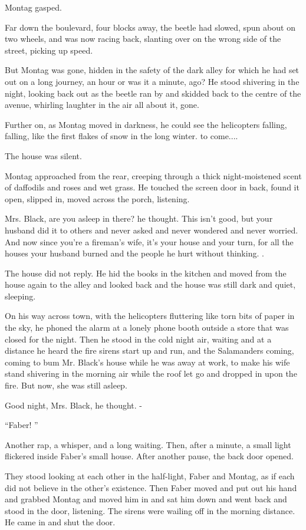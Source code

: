 \documentclass[11pt,openany]{book}
\begin{document}
Montag gasped.

Far down the boulevard, four blocks away, the beetle had slowed, spun about on two wheels, and was now racing back, slanting over on the wrong side of the street, picking up speed.

But Montag was gone, hidden in the safety of the dark alley for which he had set out on a long journey, an hour or was it a minute, ago? He stood shivering in the night, looking back out as the beetle ran by and skidded back to the centre of the avenue, whirling laughter in the air all about it, gone.

Further on, as Montag moved in darkness, he could see the helicopters falling, falling, like the first flakes of snow in the long winter. to come....

The house was silent.

Montag approached from the rear, creeping through a thick night-moistened scent of daffodils and roses and wet grass. He touched the screen door in back, found it open, slipped in, moved across the porch, listening.

Mrs. Black, are you asleep in there? he thought. This isn't good, but your husband did it to others and never asked and never wondered and never worried. And now since you're a fireman's wife, it's your house and your turn, for all the houses your husband burned and the people he hurt without thinking. .

The house did not reply. He hid the books in the kitchen and moved from the house again to the alley and looked back and the house was still dark and quiet, sleeping.

On his way across town, with the helicopters fluttering like torn bits of paper in the sky, he phoned the alarm at a lonely phone booth outside a store that was closed for the night. Then he stood in the cold night air, waiting and at a distance he heard the fire sirens start up and run, and the Salamanders coming, coming to bum Mr. Black's house while he was away at work, to make his wife stand shivering in the morning air while the roof let go and dropped in upon the fire. But now, she was still asleep.

Good night, Mrs. Black, he thought. -

``Faber! ''

Another rap, a whisper, and a long waiting. Then, after a minute, a small light flickered inside Faber's small house. After another pause, the back door opened.

They stood looking at each other in the half-light, Faber and Montag, as if each did not believe in the other's existence. Then Faber moved and put out his hand and grabbed Montag and moved him in and sat him down and went back and stood in the door, listening. The sirens were wailing off in the morning distance. He came in and shut the door.
\end{document}
